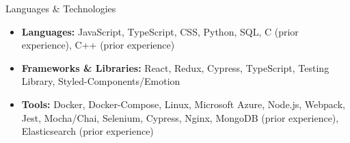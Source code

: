 \documentclass[]{mcdowellcv}
\begin{document}
	\begin{cvsection}{Languages \& Technologies}
		\begin{cvsubsection}{}{}{}
			\begin{itemize}
				\item \textbf{Languages:} JavaScript, TypeScript, CSS, Python, SQL, C (prior experience), C++ (prior experience)
				\item \textbf{Frameworks \& Libraries:} React, Redux, Cypress,   TypeScript, Testing Library, Styled-Components/Emotion
				\item \textbf{Tools:} Docker, Docker-Compose, Linux, Microsoft Azure, Node.js, Webpack, Jest, Mocha/Chai, Selenium, Cypress, Nginx, MongoDB (prior experience), Elasticsearch (prior experience)
			\end{itemize}
		\end{cvsubsection}
	\end{cvsection}
\end{document}
